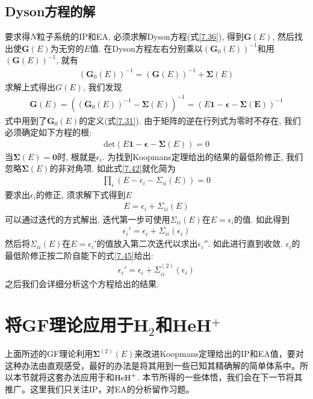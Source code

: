\subsection{Dyson方程的解}
要求得$N$粒子系统的IP和EA, 必须求解Dyson方程(式\eqref{7.36}), 得到$\mathbf{G}(E)$, 然后找出使$\mathbf{G}(E)$为无穷的$E$值. 在Dyson方程左右分别乘以$(\mathbf{G}_0(E))^{-1}$和用$(\mathbf{G}(E))^{-1}$, 就有
\begin{align}
(\mathbf{G}_0(E))^{-1} = (\mathbf{G}(E))^{-1} + \bm{\Sigma}(E)
\end{align}
求解上式得出$G(E)$, 我们发现
\begin{align}
\mathbf{G}(E) = ((\mathbf{G}_0(E))^{-1} - \bm{\Sigma}(E))^{-1} = (E\mathbf{1} - \bm{\epsilon} - \bm{\Sigma(E)})^{-1}
\end{align}
式中用到了$\mathbf{G}_0(E)$的定义(式\eqref{7.31}). 由于矩阵的逆在行列式为零时不存在, 我们必须确定如下方程的根:
\begin{align}
\mathrm{det}(E\mathbf{1} - \bm{\epsilon} - \bm{\Sigma}(E)) = 0
\end{align}
当$\bm{\Sigma}(E)=\mathbf{0}$时, 根就是$\epsilon_i$. 为找到Koopmans定理给出的结果的最低阶修正, 我们忽略$\bm{\Sigma}(E)$的非对角项. 如此式\eqref{7.42}就化简为
\begin{align}
\prod_i (E-\epsilon_i - \Sigma_{ii}(E)) = 0
\end{align}
要求出$\epsilon_i$的修正, 须求解下式得到$E$
\begin{align}
E=\epsilon_i+\Sigma_{ii}(E)
\end{align}
可以通过迭代的方式解出, 迭代第一步可使用$\Sigma_{ii}(E)$在$E=\epsilon_i$的值. 如此得到
\begin{align}
\epsilon_i' = \epsilon_i + \Sigma_{ii}(\epsilon_i)
\end{align}
然后将$\Sigma_{ii}(E)$在$E=\epsilon_i'$的值放入第二次迭代以求出$\epsilon_i''$. 如此进行直到收敛. $\epsilon_i$的最低阶修正按二阶自能下的式\eqref{7.45}给出:
\begin{align}
\epsilon_i' = \epsilon_i + \Sigma_{ii}^{(2)}(\epsilon_i)
\end{align}
之后我们会详细分析这个方程给出的结果.
\section{将GF理论应用于H$_2$和HeH$^+$}
上面所述的GF理论利用$\bm{\Sigma}^{(2)}(E)$来改进Koopmans定理给出的IP和EA值，要对这种办法由直观感受，最好的办法是将其用到一些已知其精确解的简单体系中。所以本节就将这套办法应用于和$\mathrm{HeH}^+$. 本节所得的一些体悟，我们会在下一节将其推广。这里我们只关注IP，对EA的分析留作习题。


